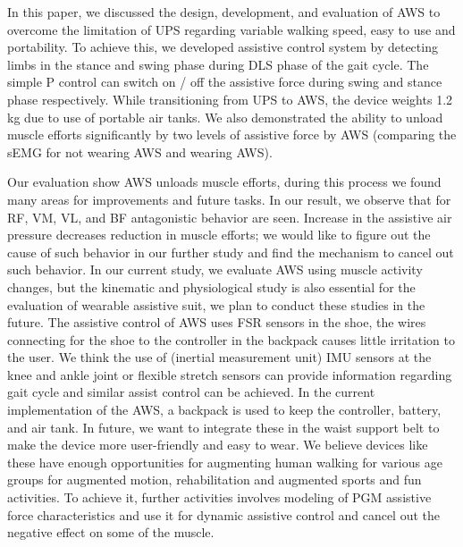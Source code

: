 \documentclass[letterpaper, 10 pt, conference]{ieeeconf}  %
\begin{document}
In this paper, we discussed the design, development, and evaluation of AWS to overcome the limitation of UPS regarding variable walking speed, easy to use and portability. To achieve this, we developed assistive control system by detecting limbs in the stance and swing phase during DLS phase of the gait cycle. The simple P control can switch on / off the assistive force during swing and stance phase respectively. While transitioning from UPS to AWS, the device weights 1.2 kg due to use of portable air tanks. We also demonstrated the ability to unload muscle efforts significantly by two levels of assistive force by AWS (comparing the sEMG for not wearing AWS and wearing AWS). 

Our evaluation show AWS unloads muscle efforts, during this process we found many areas for improvements and future tasks. In our result, we observe that for RF, VM, VL, and BF antagonistic behavior are seen. Increase in the assistive air pressure decreases reduction in muscle efforts; we would like to figure out the cause of such behavior in our further study and find the mechanism to cancel out such behavior. In our current study, we evaluate AWS using muscle activity changes, but the kinematic and physiological study is also essential for the evaluation of wearable assistive suit, we plan to conduct these studies in the future.  The assistive control of AWS uses FSR sensors in the shoe, the wires connecting for the shoe to the controller in the backpack causes little irritation to the user. We think the use of (inertial measurement unit) IMU sensors at the knee and ankle joint or flexible stretch sensors can provide information regarding gait cycle and similar assist control can be achieved. In the current implementation of the AWS, a backpack is used to keep the controller, battery, and air tank. In future, we want to integrate these in the waist support belt to make the device more user-friendly and easy to wear. 
We believe devices like these have enough opportunities for augmenting human walking for various age groups for augmented motion, rehabilitation and augmented sports and fun activities. To achieve it, further activities involves modeling of PGM assistive force characteristics and use it for dynamic assistive control and cancel out the negative effect on some of the muscle. 

\addtolength{\textheight}{-12cm}   %
\end{document}
